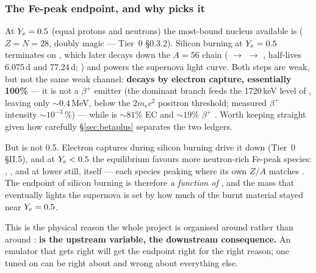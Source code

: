 \subsubsection{The Fe-peak endpoint, and why \texorpdfstring{\Ye}{Ye} picks it}
\label{sec:fepeak}

At $Y_{e} = 0.5$ (equal protons and neutrons) the most-bound nucleus available is
 ($Z = N = 28$, doubly magic --- Tier~0 \S0.3.2). Silicon burning at
$Y_{e} = 0.5$ terminates on , which later decays down the $A = 56$
chain ( $\to$  $\to$ , half-lives 6.075\,d
and 77.24\,d; \citealp{ensdf}) and powers the supernova light curve. Both steps
are weak, but not the same weak channel: \textbf{ decays by electron
capture, essentially 100\%} --- it is not a $\beta^+$ emitter (the dominant
branch feeds the 1720\,keV level of , leaving only ${\sim}0.4$\,MeV,
below the $2m_ec^2$ positron threshold; measured $\beta^+$ intensity
${\sim}10^{-3}$\,\%) --- while  is ${\sim}81\%$ EC and
${\sim}19\%$ $\beta^+$ \citep{ensdf}. Worth keeping straight given how carefully
\S\ref{sec:betaplus} separates the two ledgers.

But \Ye{} is not 0.5. Electron captures during silicon burning drive it down
(Tier~0 \S II.5), and at $Y_{e} < 0.5$ the equilibrium favours more neutron-rich
Fe-peak species: , , and at lower \Ye{} still,
 itself --- each species peaking where its own $Z/A$ matches \Ye{}
\citep[Fig.~2:  dominant for $\Ye \gtrsim 0.49$,
\,/\, for ${\approx}0.47$--0.49,  below
${\approx}0.47$]{hwe1985}. The endpoint of silicon burning is therefore \emph{a
function of \Ye}, and the  mass that eventually lights the supernova
is set by how much of the burnt material stayed near $Y_{e} = 0.5$.

\begin{invariant}
This is the physical reason the whole project is organised around \Ye{} rather
than around : \textbf{\Ye{} is the upstream variable, 
the downstream consequence.} An emulator that gets \Ye{} right will get the
endpoint right for the right reason; one tuned on  can be right
about  and wrong about everything else.
\end{invariant}

